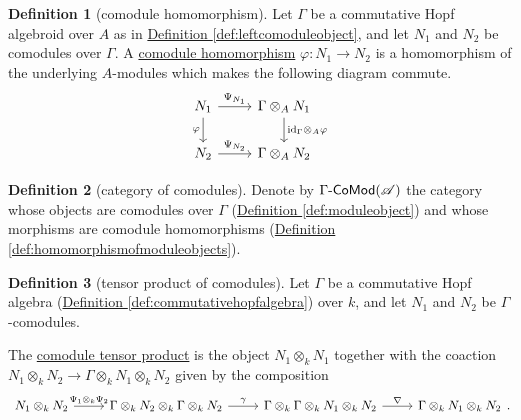 \documentclass[a4paper,10pt]{scrreprt}
\newcommand{\defn}[1]{\ul{#1}}
\def\mhyp{{\hbox{-}}}
\theoremstyle{definition}
\newtheorem{definition}{Definition}[section]
\theoremstyle{plain}
\theoremstyle{remark}
\begin{document}
\begin{definition}[comodule homomorphism]
  \label{def:comodulehomomorphism}
  Let $\Gamma$ be a commutative Hopf algebroid over $A$ as in \hyperref[def:leftcomoduleobject]{Definition \ref*{def:leftcomoduleobject}}, and let $N_{1}$ and $N_{2}$ be comodules over $\Gamma$. A \defn{comodule homomorphism} $\varphi\colon N_{1} \to N_{2}$ is a homomorphism of the underlying $A$-modules which makes the following diagram commute.
  \begin{equation*}
    \begin{tikzcd}
      N_{1} 
      \arrow[r, "\Psi_{N_{1}}"]
      \arrow[d, swap, "\varphi"]
      & \Gamma \otimes_{A} N_{1}
      \arrow[d, "\mathrm{id}_{\Gamma}\otimes_{A} \varphi"]
      \\
      N_{2} 
      \arrow[r, "\Psi_{N_{2}}"]
      & \Gamma \otimes_{A} N_{2}
    \end{tikzcd}
  \end{equation*}
\end{definition}

\begin{definition}[category of comodules]
  \label{def:categoryofcomodules}
  Denote by $\Gamma\mhyp\mathsf{CoMod}(\mathscr{A})$ the category whose objects are comodules over $\Gamma$ (\hyperref[def:moduleobject]{Definition \ref*{def:moduleobject}}) and whose morphisms are comodule homomorphisms (\hyperref[def:homomorphismofmoduleobjects]{Definition \ref*{def:homomorphismofmoduleobjects}}).
\end{definition}

\begin{definition}[tensor product of comodules]
  \label{def:tensorproductofcomodules}
  Let $\Gamma$ be a commutative Hopf algebra (\hyperref[def:commutativehopfalgebra]{Definition \ref*{def:commutativehopfalgebra}}) over $k$, and let $N_{1}$ and $N_{2}$ be $\Gamma$-comodules.

  The \defn{comodule tensor product} is the object $N_{1} \otimes_{k} N_{1}$ together with the coaction $N_{1} \otimes_{k} N_{2} \to \Gamma \otimes_{k} N_{1} \otimes_{k} N_{2}$ given by the composition
  \begin{equation*}
    \begin{tikzcd}
      N_{1} \otimes_{k} N_{2}
      \arrow[r, "\Psi_{1} \otimes_{k} \Psi_{2}"]
      & \Gamma \otimes_{k} N_{2} \otimes_{k} \Gamma \otimes_{k} N_{2}
      \arrow[r, "\gamma"]
      & \Gamma \otimes_{k} \Gamma \otimes_{k} N_{1} \otimes_{k} N_{2}
      \arrow[r, "\nabla"]
      & \Gamma \otimes_{k} N_{1} \otimes_{k} N_{2}
    \end{tikzcd}.
  \end{equation*}
\end{definition}
\end{document}
